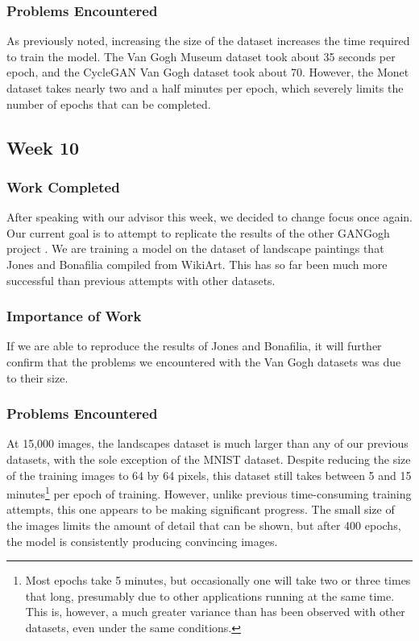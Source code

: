 \documentclass[12pt,letterpaper]{article}
\begin{document}
			\subsubsection{Problems Encountered}
				As previously noted, increasing the size of the dataset increases the time required to train the model.
				The Van Gogh Museum dataset took about 35 seconds per epoch, and the CycleGAN Van Gogh dataset took about 70.
				However, the Monet dataset takes nearly two and a half minutes per epoch, which severely limits the number of epochs that can be completed.

		\subsection{Week 10}
			\subsubsection{Work Completed}
				After speaking with our advisor this week, we decided to change focus once again.
				Our current goal is to attempt to replicate the results of the other GANGogh project \cite{otherGanGogh}.
				We are training a model on the dataset of landscape paintings that Jones and Bonafilia compiled from WikiArt.
				This has so far been much more successful than previous attempts with other datasets.
			\subsubsection{Importance of Work}
				If we are able to reproduce the results of Jones and Bonafilia, it will further confirm that the problems we encountered with the Van Gogh datasets was due to their size.
			\subsubsection{Problems Encountered}
				At 15,000 images, the landscapes dataset is much larger than any of our previous datasets, with the sole exception of the MNIST dataset.
				Despite reducing the size of the training images to 64 by 64 pixels, this dataset still takes between 5 and 15 minutes\footnote{Most epochs take 5 minutes, but occasionally one will take two or three times that long, presumably due to other applications running at the same time. This is, however, a much greater variance than has been observed with other datasets, even under the same conditions.} per epoch of training.
				However, unlike previous time-consuming training attempts, this one appears to be making significant progress.
				The small size of the images limits the amount of detail that can be shown, but after 400 epochs, the model is consistently producing convincing images.
\end{document}

